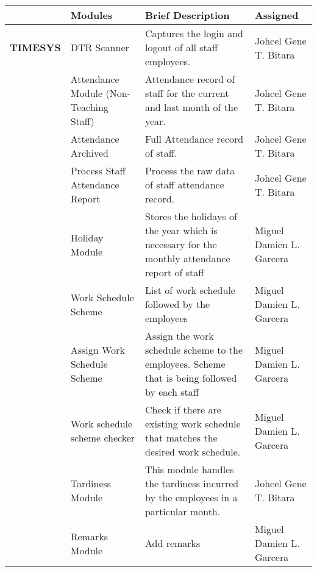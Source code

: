     
\begin{table}[H]
    \begin{tabular}{@{}p{2cm}p{3.5cm}p{6cm}p{3.5cm}@{}}
    \toprule
    \multicolumn{1}{l}{} & \textbf{Modules}                       & \textbf{Brief Description}                                                                    & \textbf{Assigned}  \\ \midrule
    \textbf{TIMESYS}     & DTR Scanner                            & Captures the login and logout of all staff employees.                                         & Johcel Gene T. Bitara               \\
                        & Attendance Module (Non-Teaching Staff) & Attendance record of staff for the current and last month of the year.                        & Johcel Gene T. Bitara               \\
                        & Attendance Archived                    & Full Attendance record of staff.                                                              & Johcel Gene T. Bitara               \\
                        & Process Staff Attendance Report        & Process the raw data of staff attendance record.                                              & Johcel Gene T. Bitara               \\
                        & Holiday Module                         & Stores the holidays of the year which is necessary for the monthly attendance report of staff & Miguel Damien L. Garcera               \\
                        & Work Schedule Scheme                   & List of work schedule followed by the employees                                               & Miguel Damien L. Garcera               \\
                        & Assign Work Schedule Scheme            & Assign the work schedule scheme to the employees. Scheme that is being followed by each staff & Miguel Damien L. Garcera               \\
                        & Work schedule scheme checker           & Check if there are existing work schedule that matches the desired work schedule.             & Miguel Damien L. Garcera               \\
                        & Tardiness Module                       & This module handles the tardiness incurred by the employees in a particular month.            & Johcel Gene T. Bitara               \\
                        & Remarks Module                         & Add remarks                                                                                   & Miguel Damien L. Garcera               \\

\end{tabular}
\end{table}
